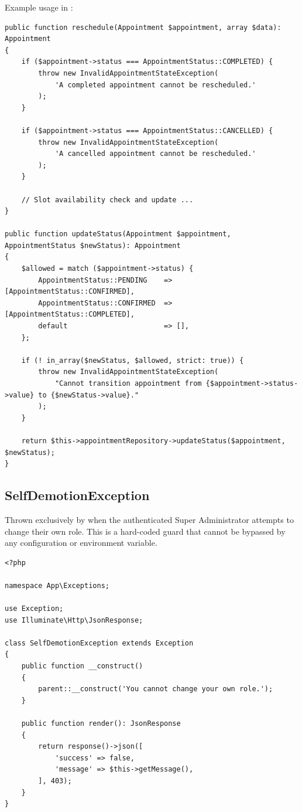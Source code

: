 Example usage in :

\begin{lstlisting}[style=php, caption={Contextual \phpclass{InvalidAppointmentStateException}
  throws within \texttt{AppointmentService}.}]
public function reschedule(Appointment $appointment, array $data): Appointment
{
    if ($appointment->status === AppointmentStatus::COMPLETED) {
        throw new InvalidAppointmentStateException(
            'A completed appointment cannot be rescheduled.'
        );
    }

    if ($appointment->status === AppointmentStatus::CANCELLED) {
        throw new InvalidAppointmentStateException(
            'A cancelled appointment cannot be rescheduled.'
        );
    }

    // Slot availability check and update ...
}

public function updateStatus(Appointment $appointment, AppointmentStatus $newStatus): Appointment
{
    $allowed = match ($appointment->status) {
        AppointmentStatus::PENDING    => [AppointmentStatus::CONFIRMED],
        AppointmentStatus::CONFIRMED  => [AppointmentStatus::COMPLETED],
        default                       => [],
    };

    if (! in_array($newStatus, $allowed, strict: true)) {
        throw new InvalidAppointmentStateException(
            "Cannot transition appointment from {$appointment->status->value} to {$newStatus->value}."
        );
    }

    return $this->appointmentRepository->updateStatus($appointment, $newStatus);
}
\end{lstlisting}

\subsection{SelfDemotionException}
\label{sec:ex-self-demotion}

Thrown exclusively by  when the
authenticated Super Administrator attempts to change their own role. This
is a hard-coded guard that cannot be bypassed by any configuration or
environment variable.

\begin{lstlisting}[style=php, caption={\texttt{app/Exceptions/SelfDemotionException.php}.}]
<?php

namespace App\Exceptions;

use Exception;
use Illuminate\Http\JsonResponse;

class SelfDemotionException extends Exception
{
    public function __construct()
    {
        parent::__construct('You cannot change your own role.');
    }

    public function render(): JsonResponse
    {
        return response()->json([
            'success' => false,
            'message' => $this->getMessage(),
        ], 403);
    }
}
\end{lstlisting}

